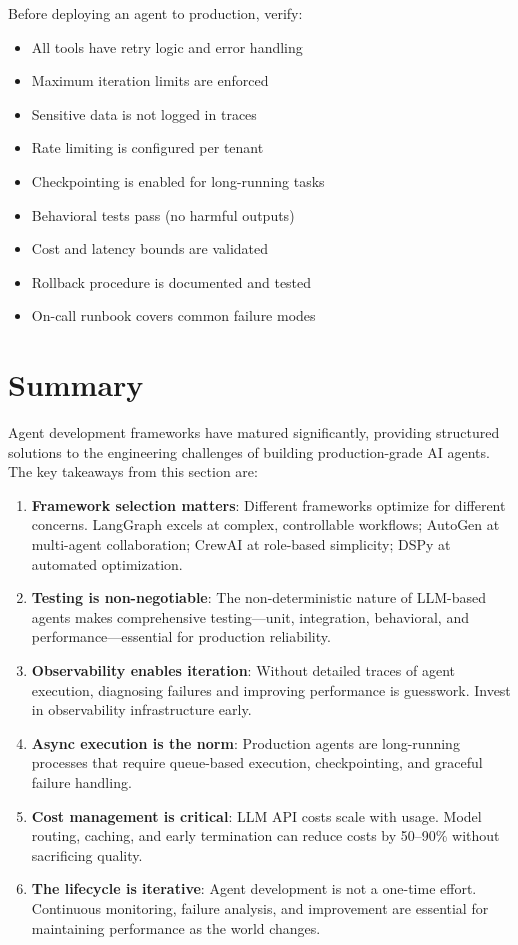 \begin{warningbox}
Before deploying an agent to production, verify:

\begin{itemize}
  \item All tools have retry logic and error handling
  \item Maximum iteration limits are enforced
  \item Sensitive data is not logged in traces
  \item Rate limiting is configured per tenant
  \item Checkpointing is enabled for long-running tasks
  \item Behavioral tests pass (no harmful outputs)
  \item Cost and latency bounds are validated
  \item Rollback procedure is documented and tested
  \item On-call runbook covers common failure modes
\end{itemize}
\end{warningbox}

\section{Summary}
\label{subsec:agent-dev-summary}

Agent development frameworks have matured significantly, providing structured solutions to the engineering challenges of building production-grade AI agents. The key takeaways from this section are:

\begin{enumerate}
  \item \textbf{Framework selection matters}: Different frameworks optimize for different concerns. LangGraph excels at complex, controllable workflows; AutoGen at multi-agent collaboration; CrewAI at role-based simplicity; DSPy at automated optimization.
  \item \textbf{Testing is non-negotiable}: The non-deterministic nature of LLM-based agents makes comprehensive testing---unit, integration, behavioral, and performance---essential for production reliability.
  \item \textbf{Observability enables iteration}: Without detailed traces of agent execution, diagnosing failures and improving performance is guesswork. Invest in observability infrastructure early.
  \item \textbf{Async execution is the norm}: Production agents are long-running processes that require queue-based execution, checkpointing, and graceful failure handling.
  \item \textbf{Cost management is critical}: LLM API costs scale with usage. Model routing, caching, and early termination can reduce costs by 50--90\% without sacrificing quality.
  \item \textbf{The lifecycle is iterative}: Agent development is not a one-time effort. Continuous monitoring, failure analysis, and improvement are essential for maintaining performance as the world changes.
\end{enumerate}

